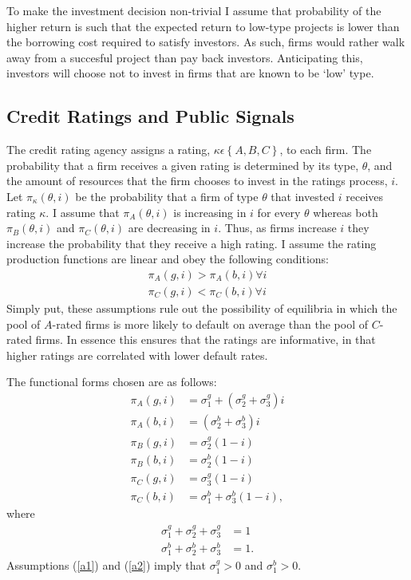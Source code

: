 \documentclass[notitlepage]{article}
\begin{document}
To make the investment decision non-trivial I assume that probability of the higher return is such that the expected return to low-type projects is lower than the borrowing cost required to satisfy investors. As such, firms would rather walk away from a succesful project than pay back investors. Anticipating this, investors will choose not to invest in firms that are known to be `low' type.

\subsection{Credit Ratings and Public Signals}
The credit rating agency assigns a rating, $\kappa\epsilon\left\{A,B,C\right\}$, to each firm. The probability that a firm receives a given rating is determined by its type, $\theta$, and the amount of resources that the firm chooses to invest in the ratings process, $i$. Let $\pi_{\kappa}(\theta,i)$ be the probability that a firm of type $\theta$ that invested $i$ receives rating $\kappa$. I assume that $\pi_{A}(\theta,i)$ is increasing in $i$ for every $\theta$ whereas both $\pi_{B}(\theta,i)$ and $\pi_{C}(\theta,i)$ are decreasing in $i$. Thus, as firms increase $i$ they increase the probability that they receive a high rating. I assume the rating production functions are linear and obey the following conditions:
\begin{align} 
\label{a1}\pi_{A}(g,i)>\pi_{A}(b,i) \forall i \\
\label{a2}\pi_{C}(g,i)<\pi_{C}(b,i) \forall i 
\end{align}
Simply put, these assumptions rule out the possibility of equilibria in which the pool of $A$-rated firms is more likely to default on average than the pool of $C$-rated firms. In essence this ensures that the ratings are informative, in that higher ratings are correlated with lower default rates.

The functional forms chosen are as follows:
\begin{align*}
	\pi_{A}(g,i) & = \sigma^{g}_{1} + (\sigma^{g}_{2}+\sigma^{g}_{3})i\\
	\pi_{A}(b,i) & =         (\sigma^{b}_{2}+\sigma^{b}_{3})i\\
	\pi_{B}(g,i) & =          \sigma^{g}_{2}(1-i )\\
	\pi_{B}(b,i) & =          \sigma^{b}_{2}(1-i )\\
	\pi_{C}(g,i) & =          \sigma^{g}_{3}(1-i )\\
	\pi_{C}(b,i) & = \sigma^{b}_{1} +  \sigma^{b}_{3}(1-i ),
\end{align*}
where
\begin{align*}
\sigma^{g}_{1}+\sigma^{g}_{2}+\sigma^{g}_{3} & =1\\
\sigma^{b}_{1}+\sigma^{b}_{2}+\sigma^{b}_{3} & =1.
\end{align*}
Assumptions (\ref{a1}) and (\ref{a2}) imply that $\sigma^{g}_{1}>0$ and $\sigma^{b}_{1}>0$.
\end{document}
